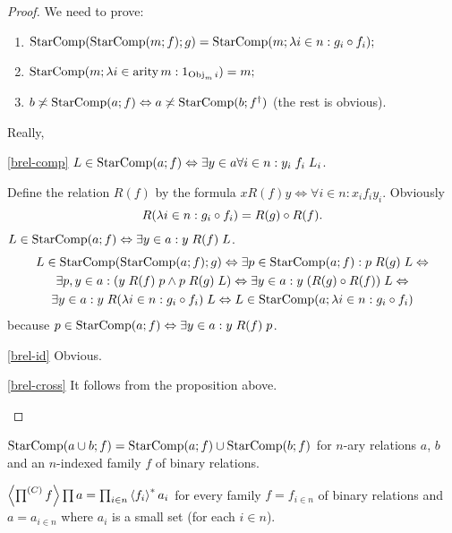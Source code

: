 \begin{proof}
We need to prove:
\begin{enumerate}
\item \label{brel-comp}$\operatorname{StarComp}(\operatorname{StarComp}(m;f);g)=\operatorname{StarComp}(m;\lambda i\in n:g_{i}\circ f_{i});$
\item \label{brel-id}$\operatorname{StarComp}(m;\lambda i\in\operatorname{arity} m:1_{\operatorname{Obj}_{m}i})=m;$
\item \label{brel-cross}$b\not\asymp\operatorname{StarComp}(a;f)\Leftrightarrow a\not\asymp\operatorname{StarComp}(b;f^{\dagger})$
(the rest is obvious).
\end{enumerate}
Really,
\begin{widedisorder}
\item [{\ref{brel-comp}}] $L\in\operatorname{StarComp}(a;f)\Leftrightarrow\exists y\in a\forall i\in n:y_{i}\mathrel{f_{i}}L_{i}$.


Define the relation $R(f)$ by the formula $x\mathrel{R(f)}y\Leftrightarrow\forall i\in n:x_{i}\mathrel{f_{i}}y_{i}$.
Obviously 
\[
R(\lambda i\in n:g_{i}\circ f_{i})=R(g)\circ R(f).
\]
$L\in\operatorname{StarComp}(a;f)\Leftrightarrow\exists y\in a:y\mathrel{R(f)}L$.
\begin{multline*}
L\in\operatorname{StarComp}(\operatorname{StarComp}(a;f);g)\Leftrightarrow\exists p\in\operatorname{StarComp}(a;f):p\mathrel{R(g)}L\Leftrightarrow\\
\exists p,y\in a:(y\mathrel{R(f)}p\wedge p\mathrel{R(g)}L)\Leftrightarrow\exists y\in a:y\mathrel{(R(g)\circ R(f))}L\Leftrightarrow\\
\exists y\in a:y\mathrel{R(\lambda i\in n:g_{i}\circ f_{i})}L\Leftrightarrow L\in\operatorname{StarComp}(a;\lambda i\in n:g_{i}\circ f_{i})
\end{multline*}
 because $p\in\operatorname{StarComp}(a;f)\Leftrightarrow\exists y\in a:y\mathrel{R(f)}p$.

\item [{\ref{brel-id}}] Obvious.
\item [{\ref{brel-cross}}] It follows from the proposition above.
\end{widedisorder}
\end{proof}
\begin{obvious}
$\operatorname{StarComp}(a\cup b;f)=\operatorname{StarComp}(a;f)\cup\operatorname{StarComp}(b;f)$ for $n$-ary
relations $a$, $b$ and an $n$-indexed family $f$ of binary relations.\end{obvious}
\begin{thm}
$\left\langle \prod^{(C)}f\right\rangle\prod a=\prod_{i\in n}\left\langle f_{i}\right\rangle ^{\ast}a_{i}$
for every family $f=f_{i\in n}$ of binary relations and $a=a_{i\in n}$
where $a_{i}$ is a small set (for each $i\in n$).\end{thm}
